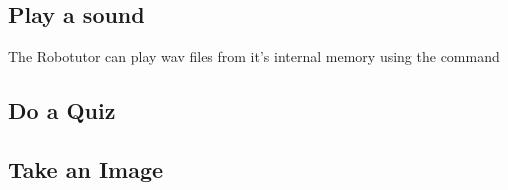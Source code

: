 \subsection{Play a sound}
The Robotutor can play wav files from it's internal memory using the command

\subsection{Do a Quiz}

\subsection{Take an Image}


